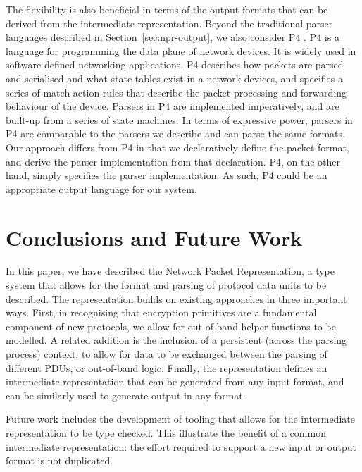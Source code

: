 \documentclass[10pt,sigconf]{acmart}
\begin{document}
The flexibility is also beneficial in terms of the output formats that can be derived from
the intermediate representation. Beyond the traditional parser languages described in
Section~\ref{sec:npr-output}, we also consider P4
\cite{bosshart:2014:p4,p4consortium:2018:v16spec-20180531}. P4 is a language for
programming the data plane of network devices. It is widely used in software defined
networking applications. P4 describes how packets are parsed and serialised and what state
tables exist in a network devices, and specifies a series of match-action rules that
describe the packet processing and forwarding behaviour of the device. Parsers in P4 are
implemented imperatively, and are built-up from a series of state machines. In terms of
expressive power, parsers in P4 are comparable to the parsers we describe and can parse
the same formats. Our approach differs from P4 in that we declaratively define the packet
format, and derive the parser implementation from that declaration. P4, on the other hand,
simply specifies the parser implementation. As such, P4 could be an appropriate output
language for our system.

\section{Conclusions and Future Work}
\label{sec:conclusion}

In this paper, we have described the Network Packet Representation, a type system that
allows for the format and parsing of protocol data units to be described. The
representation builds on existing approaches in three important ways. First, in
recognising that encryption primitives are a fundamental component of new protocols, we
allow for out-of-band helper functions to be modelled. A related addition is the inclusion
of a persistent (across the parsing process) context, to allow for data to be exchanged
between the parsing of different PDUs, or out-of-band logic. Finally, the representation
defines an intermediate representation that can be generated from any input format, and
can be similarly used to generate output in any format.

Future work includes the development of tooling that allows for the intermediate
representation to be type checked. This illustrate the benefit of a common intermediate
representation: the effort required to support a new input or output format is not
duplicated.
\end{document}
